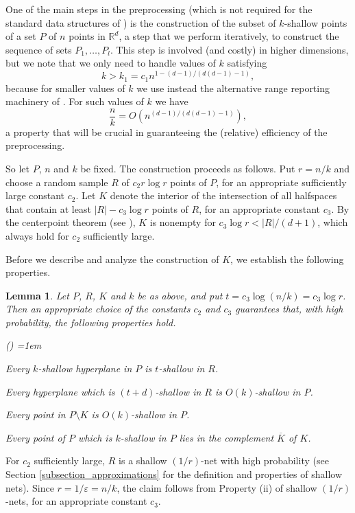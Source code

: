 \documentclass[11pt]{article}
\newtheorem{lemma}[theorem]{Lemma}
\newcounter{itemcounter}
\def\reals{\mathbb R}
\def\eps{\varepsilon}
\def\ol#1{\overline{#1}}
\begin{document}
 One of the main steps in the preprocessing (which is not required for the standard data structures of \cite{mat92a, mat92b}) is the construction of the subset of $k$-shallow points of a set $P$ of $n$ points in $\reals^{d}$, a step that we perform iteratively, to construct the sequence of sets $P_{1}, \ldots, P_{l}$. This step is involved (and costly) in higher dimensions, but we note that we only need to handle values of $k$ satisfying
$$
k > k_{1} = c_{1} n^{1 - (d-1)/(d(d-1)-1)},
$$
because for smaller values of $k$ we use instead the alternative range reporting machinery of \cite{mat92b}. For such values of $k$ we have
\begin{equation} \label{eq_range_counting_preproc}
\frac{n}{k} = O\left(n^{(d-1)/(d(d-1)-1)}\right),
\end{equation}
a property that will be crucial in guaranteeing the (relative) efficiency of the preprocessing.

So let $P$, $n$ and $k$ be fixed. The construction proceeds as follows. Put $r = n/k$ and choose a random sample $R$ of $c_{2}r\log r$ points of $P$, for an appropriate sufficiently large constant $c_{2}$. Let $K$ denote the interior of the intersection of all halfspaces that contain at least $|R| - c_{3}\log r$ points of $R$, for an appropriate constant $c_{3}$. By the centerpoint theorem (see \cite{mat02}), $K$ is nonempty for $c_{3}\log r < |R|/(d+1)$, which always hold for $c_{2}$ sufficiently large.

Before we describe and analyze the construction of $K$, we establish the following properties.

\begin{lemma} \label{lemma_shallow_net}
Let $P$, $R$, $K$ and $k$ be as above, and put $t = c_{3}\log(n/k) = c_{3}\log r$. Then an appropriate choice of the constants $c_{2}$ and $c_{3}$ guarantees that, with high probability, the following properties hold.
\begin{list} {\emph{()}}{ \leftmargin=1em}
\item Every $k$-shallow hyperplane in $P$ is $t$-shallow in $R$.
\item Every hyperplane which is $(t + d)$-shallow in $R$ is $O(k)$-shallow in $P$.
\item Every point in $P \setminus K$ is $O(k)$-shallow in $P$.
\item Every point of $P$ which is $k$-shallow in $P$ lies in the complement $\ol{K}$ of $K$.
\end{list}
\end{lemma}
 For $c_{2}$ sufficiently large, $R$ is a shallow $(1/r)$-net with high probability (see Section \ref{subsection_approximations} for the definition and properties of shallow nets). Since $r = 1/\eps = n/k$, the claim follows from Property (ii) of shallow $(1/r)$-nets, for an appropriate constant $c_{3}$.
\end{document}
